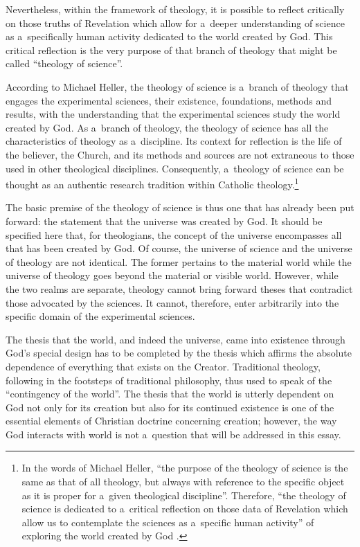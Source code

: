 Nevertheless, within the framework of theology, it is possible to reflect critically on those truths of Revelation which allow for a~deeper understanding of science as a~specifically human activity dedicated to the world created by God. This critical reflection is the very purpose of that branch of theology that might be called ``theology of science''.



According to Michael Heller, the theology of science is a~branch of theology that engages the experimental sciences, their existence, foundations, methods and results, with the understanding that the experimental sciences study the world created by God. As a~branch of theology, the theology of science has all the characteristics of theology as a~discipline. Its context for reflection is the life of the believer, the Church, and its methods and sources are not extraneous to those used in other theological disciplines. Consequently, a~theology of science can be thought as an authentic research tradition within Catholic theology.\footnote{In the words of Michael Heller, ``the purpose of the theology of science is the same as that of all theology, but always with reference to the specific object as it is proper for a~given theological discipline''. Therefore, ``the theology of science is dedicated to a~critical reflection on those data of Revelation which allow us to contemplate the sciences as a~specific human activity'' of exploring the world created by God 
\parencite[][pp.97 and 99]{heller_new_1996}.%
}



The basic premise of the theology of science is thus one that has already been put forward: the statement that the universe was created by God. It should be specified here that, for theologians, the concept of the universe encompasses all that has been created by God. Of course, the universe of science and the universe of theology are not identical. The former pertains to the material world while the universe of theology goes beyond the material or visible world. However, while the two realms are separate, theology cannot bring forward theses that contradict those advocated by the sciences. It cannot, therefore, enter arbitrarily into the specific domain of the experimental sciences.



The thesis that the world, and indeed the universe, came into existence through God's special design has to be completed by the thesis which affirms the absolute dependence of everything that exists on the Creator. Traditional theology, following in the footsteps of traditional philosophy, thus used to speak of the ``contingency of the world''. The thesis that the world is utterly dependent on God not only for its creation but also for its continued existence is one of the essential elements of Christian doctrine concerning creation; however, the way God interacts with world is not a~question that will be addressed in this essay.



